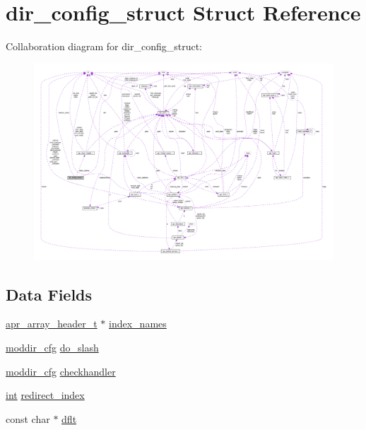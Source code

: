 \hypertarget{structdir__config__struct}{}\section{dir\+\_\+config\+\_\+struct Struct Reference}
\label{structdir__config__struct}


Collaboration diagram for dir\+\_\+config\+\_\+struct\+:
\nopagebreak
\begin{figure}[H]
\begin{center}
\leavevmode
\includegraphics[width=350pt]{structdir__config__struct__coll__graph}
\end{center}
\end{figure}
\subsection*{Data Fields}
\begin{DoxyCompactItemize}
\item 
\hyperlink{structapr__array__header__t}{apr\+\_\+array\+\_\+header\+\_\+t} $\ast$ \hyperlink{structdir__config__struct_a56542ca2a4e909ea6a3bc1fd1b79d990}{index\+\_\+names}
\item 
\hyperlink{mod__dir_8c_ae15400bbd53e70730d2d0aef43bd5c17}{moddir\+\_\+cfg} \hyperlink{structdir__config__struct_ad739a7ef1f7f339bb707f61ae08e8e43}{do\+\_\+slash}
\item 
\hyperlink{mod__dir_8c_ae15400bbd53e70730d2d0aef43bd5c17}{moddir\+\_\+cfg} \hyperlink{structdir__config__struct_a45445632295173b58ba9d7c1c5769adf}{checkhandler}
\item 
\hyperlink{pcre_8txt_a42dfa4ff673c82d8efe7144098fbc198}{int} \hyperlink{structdir__config__struct_a043c8568279a32404228f2a6754d5c1d}{redirect\+\_\+index}
\item 
const char $\ast$ \hyperlink{structdir__config__struct_a8bada03ec1d93573531d5c090eaa6987}{dflt}
\end{DoxyCompactItemize}


